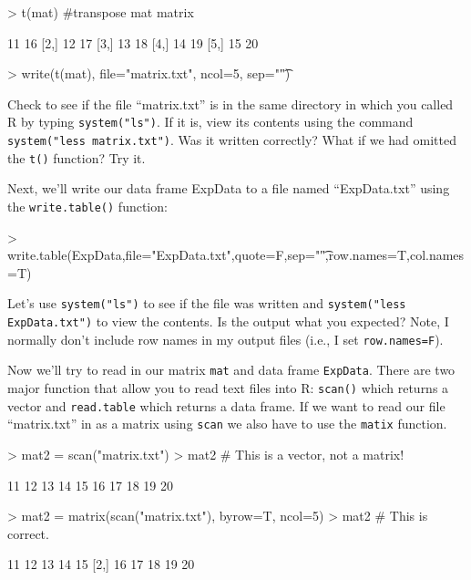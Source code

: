 \documentclass[12pt]{article}
\newcommand{\code}[1]{{\texttt{#1}}}
\begin{document}
\begin{Schunk}
\begin{Sinput}
> t(mat) #transpose mat matrix
\end{Sinput}
\begin{Soutput}
     [,1] [,2]
[1,]   11   16
[2,]   12   17
[3,]   13   18
[4,]   14   19
[5,]   15   20
\end{Soutput}
\begin{Sinput}
> write(t(mat), file="matrix.txt", ncol=5, sep="\t")
\end{Sinput}
\end{Schunk}

Check to see if the file ``matrix.txt'' is in the same directory in which you called R by typing \code{system("ls")}.  If it is, view its contents using the command \code{system("less matrix.txt")}.  Was it written correctly?  What if we had omitted the \code{t()} function?  Try it.

Next, we'll write our data frame ExpData to a file named ``ExpData.txt'' using the \code{write.table()} function:

\begin{Schunk}
\begin{Sinput}
> write.table(ExpData,file="ExpData.txt",quote=F,sep="\t",row.names=T,col.names=T)
\end{Sinput}
\end{Schunk}

Let's use \code{system("ls")} to see if the file was written and \code{system("less ExpData.txt")} to view the contents.  Is the output what you expected?  Note, I normally don't include row names in my output files (i.e., I set \code{row.names=F}).

Now we'll try to read in our matrix \code{mat} and data frame \code{ExpData}.  There are two major function that allow you to read text files into R: \code{scan()} which returns a vector and \code{read.table} which returns a data frame.  If we want to read our file ``matrix.txt'' in as a matrix using \code{scan} we also have to use the \code{matix} function.   

\begin{Schunk}
\begin{Sinput}
> mat2 = scan("matrix.txt")
> mat2 # This is a vector, not a matrix!
\end{Sinput}
\begin{Soutput}
 [1] 11 12 13 14 15 16 17 18 19 20
\end{Soutput}
\begin{Sinput}
> mat2 = matrix(scan("matrix.txt"), byrow=T, ncol=5)
> mat2 # This is correct.
\end{Sinput}
\begin{Soutput}
     [,1] [,2] [,3] [,4] [,5]
[1,]   11   12   13   14   15
[2,]   16   17   18   19   20
\end{Soutput}
\end{Schunk}
\end{document}
